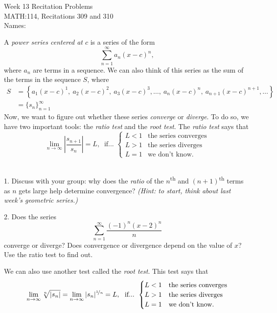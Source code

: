 \documentclass[11pt]{article}
\begin{document}
	{
		\centering
		\huge{Week 13 Recitation Problems} \\
		\Large{MATH:114, Recitations 309 and 310} \\[2em]
	}
	\normalsize{Names:} \hrulefill
	\vspace{3em}
	
	A \textit{power series centered at $c$} is a series of the form $$ \sum_{n=1}^\infty a_n(x-c)^n, $$ where $a_n$ are terms in a sequence. We can also think of this series as the sum of the terms in the sequence $S$, where
	\begin{align*} 
		S &= \left\{a_1(x-c)^1, \ a_2(x-c)^2, \ a_3(x-c)^3, \dots, \ a_n(x-c)^n, \ a_{n+1}(x-c)^{n+1}, \dots \right\} \\
		&= \{s_n\}_{n=1}^{\infty}
	\end{align*}
	Now, we want to figure out whether these series \textit{converge} or \textit{diverge}. To do so, we have two important tools: the \textit{ratio test} and the \textit{root test}. The \textit{ratio test} says that $$ \lim_{n \to \infty} \left\lvert \frac{s_{n+1}}{s_n} \right\rvert = L, \ \text{ if... } \begin{cases} L < 1 & \text{the series converges} \\ L > 1 & \text{the series diverges} \\ {L=1} & \text{we don't know.}\end{cases} $$
	
	\vspace{1em}
	\dotfill \\[1em]
	
	1. Discuss with your group: why does the \textit{ratio} of the $n$\textsuperscript{th} and $(n+1)$\textsuperscript{th} terms as $n$ gets large help determine convergence? \textit{(Hint: to start, think about last week's geometric series.)}
	
	\vspace{6em}
	2. Does the series $$ \sum_{n=1}^\infty \frac{(-1)^n(x-2)^n}{n} $$ converge or diverge? Does convergence or divergence depend on the value of $x$? Use the ratio test to find out.
	
	\newpage
	We can also use another test called the \textit{root test}. This test says that $$ \lim_{n \to \infty} \sqrt[n]{|s_n|} = \lim_{n \to \infty} |s_n|^{\nicefrac 1n} = L, \ \text{ if... } \begin{cases} L < 1 & \text{the series converges} \\ L > 1 & \text{the series diverges} \\ {L=1} & \text{we don't know.}\end{cases} $$
	
\end{document}
